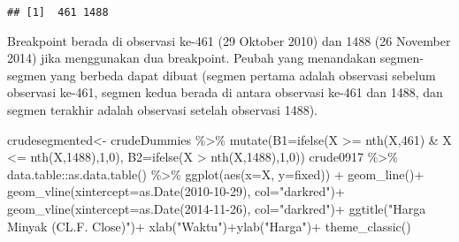 \documentclass[
]{book}
\newenvironment{Shaded}{\begin{snugshade}}{\end{snugshade}}
\newcommand{\AttributeTok}[1]{\textcolor[rgb]{0.77,0.63,0.00}{#1}}
\newcommand{\DecValTok}[1]{\textcolor[rgb]{0.00,0.00,0.81}{#1}}
\newcommand{\FunctionTok}[1]{\textcolor[rgb]{0.00,0.00,0.00}{#1}}
\newcommand{\NormalTok}[1]{#1}
\newcommand{\OtherTok}[1]{\textcolor[rgb]{0.56,0.35,0.01}{#1}}
\newcommand{\SpecialCharTok}[1]{\textcolor[rgb]{0.00,0.00,0.00}{#1}}
\newcommand{\StringTok}[1]{\textcolor[rgb]{0.31,0.60,0.02}{#1}}
\begin{document}
\begin{verbatim}
## [1]  461 1488
\end{verbatim}

Breakpoint berada di observasi ke-461 (29 Oktober 2010) dan 1488 (26 November 2014) jika menggunakan dua breakpoint. Peubah yang menandakan segmen-segmen yang berbeda dapat dibuat (segmen pertama adalah observasi sebelum observasi ke-461, segmen kedua berada di antara observasi ke-461 dan 1488, dan segmen terakhir adalah observasi setelah observasi 1488).

\begin{Shaded}
\begin{Highlighting}[]
\NormalTok{crudesegmented}\OtherTok{\textless{}{-}}\NormalTok{ crudeDummies }\SpecialCharTok{\%\textgreater{}\%} 
  \FunctionTok{mutate}\NormalTok{(}\AttributeTok{B1=}\FunctionTok{ifelse}\NormalTok{(X }\SpecialCharTok{\textgreater{}=} \FunctionTok{nth}\NormalTok{(X,}\DecValTok{461}\NormalTok{) }\SpecialCharTok{\&}\NormalTok{ X }\SpecialCharTok{\textless{}=} \FunctionTok{nth}\NormalTok{(X,}\DecValTok{1488}\NormalTok{),}\DecValTok{1}\NormalTok{,}\DecValTok{0}\NormalTok{),}
         \AttributeTok{B2=}\FunctionTok{ifelse}\NormalTok{(X }\SpecialCharTok{\textgreater{}} \FunctionTok{nth}\NormalTok{(X,}\DecValTok{1488}\NormalTok{),}\DecValTok{1}\NormalTok{,}\DecValTok{0}\NormalTok{))}
\NormalTok{crude0917 }\SpecialCharTok{\%\textgreater{}\%}\NormalTok{ data.table}\SpecialCharTok{::}\FunctionTok{as.data.table}\NormalTok{() }\SpecialCharTok{\%\textgreater{}\%}
  \FunctionTok{ggplot}\NormalTok{(}\FunctionTok{aes}\NormalTok{(}\AttributeTok{x=}\NormalTok{X, }\AttributeTok{y=}\NormalTok{fixed)) }\SpecialCharTok{+}
      \FunctionTok{geom\_line}\NormalTok{()}\SpecialCharTok{+}
      \FunctionTok{geom\_vline}\NormalTok{(}\AttributeTok{xintercept=}\FunctionTok{as.Date}\NormalTok{(}\StringTok{\textquotesingle{}2010{-}10{-}29\textquotesingle{}}\NormalTok{), }\AttributeTok{col=}\StringTok{"darkred"}\NormalTok{)}\SpecialCharTok{+}
      \FunctionTok{geom\_vline}\NormalTok{(}\AttributeTok{xintercept=}\FunctionTok{as.Date}\NormalTok{(}\StringTok{\textquotesingle{}2014{-}11{-}26\textquotesingle{}}\NormalTok{), }\AttributeTok{col=}\StringTok{"darkred"}\NormalTok{)}\SpecialCharTok{+}
      \FunctionTok{ggtitle}\NormalTok{(}\StringTok{"Harga Minyak (CL.F. Close)"}\NormalTok{)}\SpecialCharTok{+}
      \FunctionTok{xlab}\NormalTok{(}\StringTok{"Waktu"}\NormalTok{)}\SpecialCharTok{+}\FunctionTok{ylab}\NormalTok{(}\StringTok{"Harga"}\NormalTok{)}\SpecialCharTok{+}
      \FunctionTok{theme\_classic}\NormalTok{()}
\end{Highlighting}
\end{Shaded}
\end{document}
